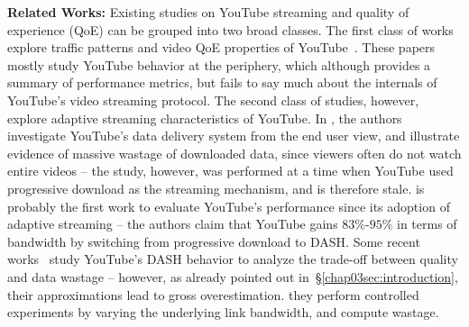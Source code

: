 {\bf Related Works:} Existing studies on YouTube streaming and quality of experience (QoE) can be grouped into two broad classes.
The first class of works explore traffic patterns and video QoE properties of YouTube~\cite{gill2007youtube,krishnappa2013dashing,wamser2016modeling,wamser2015poster,6757893ieeeexp,7129790ieeeexp}.
These papers mostly study YouTube behavior at the periphery, which although provides a summary of performance metrics, but fails to say much about the internals of YouTube's video streaming protocol.
The second class of studies, however, explore adaptive streaming characteristics of YouTube.
In \cite{finamore2011youtube}, the authors investigate YouTube's data delivery system from the end user view, and illustrate evidence of massive wastage of downloaded data, since viewers often do not watch entire videos -- the study, however, was performed at a time when YouTube used progressive download as the streaming mechanism, and is therefore stale.
\cite{krishnappa2013dashing} is probably the first work to evaluate YouTube's performance since its adoption of adaptive streaming -- the authors claim that YouTube gains $83\%$-$95\%$ in terms of bandwidth by switching from progressive download to DASH.
Some recent works~\cite{sieber2015cost,seufert2015youtube,sieber2016sacrificing} study YouTube's DASH behavior to analyze the trade-off between quality and data wastage -- however, as already pointed out in~\S\ref{chap03sec:introduction}, their approximations lead to gross overestimation. they perform controlled experiments by varying the underlying link bandwidth, and compute wastage.

